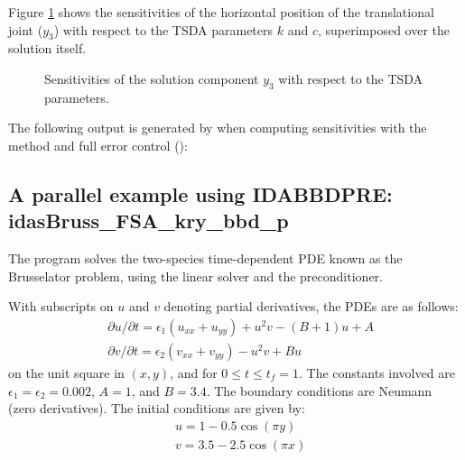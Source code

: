 Figure \ref{f:x2sensi} shows the sensitivities of the horizontal position of the
translational joint ($y_3$) with respect to the TSDA parameters $k$ and $c$,
superimposed over the solution itself.
\begin{figure}[h]
  {\centerline{}}
  \caption{Sensitivities of the solution component $y_3$ with respect to the TSDA parameters.}
  \label{f:x2sensi}
\end{figure}

The following output is generated by  when computing
sensitivities with the  method and full error
control ():




\subsection{A parallel example using IDABBDPRE: idasBruss\_FSA\_kry\_bbd\_p}
\label{ss:idasBruss_FSA_kry_bbd_p}

The  program solves the two-species time-dependent
PDE known as the Brusselator problem, using the {\idaspgmr} linear solver and the
{\idabbdpre} preconditioner.

With subscripts on $u$ and $v$ denoting partial derivatives, the PDEs
are as follows:
\begin{equation*}
\begin{split}
  &\partial u / \partial t = \epsilon_1 (u_{xx} + u_{yy})
                              + u^2 v - (B + 1) u + A \\
  &\partial v / \partial t = \epsilon_2 (v_{xx} + v_{yy})
                              - u^2 v + B  u
\end{split}
\end{equation*}
on the unit square in $(x,y)$, and for $0 \leq t \leq t_f = 1$.
The constants involved are $\epsilon_1 = \epsilon_2 = 0.002$, $A = 1$,
and $B = 3.4$.  The boundary conditions are Neumann (zero derivatives).
The initial conditions are given by:
\begin{equation*}
\begin{split}
  &u = 1 - 0.5 \cos(\pi y) \\
  &v = 3.5 - 2.5 \cos(\pi x)
\end{split}
\end{equation*}

